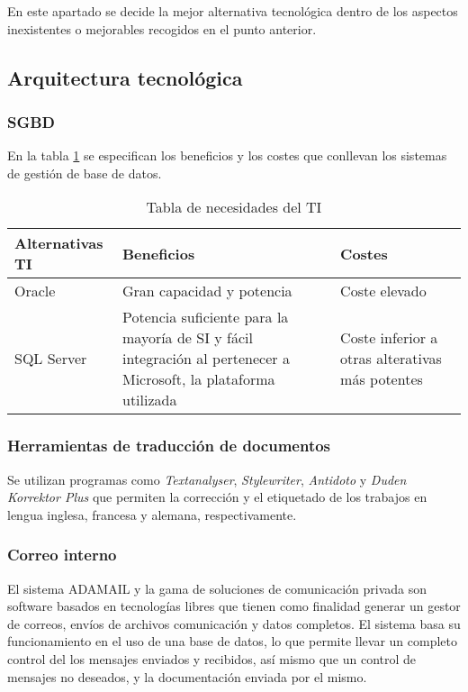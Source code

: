 \documentclass[11pt,a4paper,spanish,twoside]{book}
\begin{document}
En este apartado se decide la mejor alternativa tecnológica
dentro de los aspectos inexistentes o mejorables recogidos en el punto
anterior.

\subsection{Arquitectura tecnológica} \label{ss:7.2.1}
\subsubsection{SGBD}
En la tabla \ref{Tab:TabNecTI} se especifican los beneficios y los costes que
conllevan los sistemas de gestión de base de datos.
\begin{table}[!h]
\centering
  \begin{tabular}{p{3cm}p{4.7cm}p{2.3cm}}
    \textbf{Alternativas TI} & \textbf{Beneficios} &
    \textbf{Costes} \\
    \hline \hline
    Oracle\cite{ora} & Gran capacidad y potencia & Coste elevado\\ \hline
    SQL Server\cite{sql} & Potencia suficiente para la mayoría de SI y fácil
    integración al pertenecer a Microsoft, la plataforma utilizada & Coste
    inferior a otras alterativas más potentes\\ \hline
  \end{tabular}
\caption{Tabla de necesidades del TI} \label{Tab:TabNecTI}
\end{table}

\subsubsection{Herramientas de traducción de documentos}
Se utilizan programas como \emph{Textanalyser}, \emph{Stylewriter},
\emph{Antidoto} y \emph{Duden Korrektor Plus} que permiten la corrección y el
etiquetado de los trabajos en lengua inglesa, francesa y alemana,
respectivamente\cite{tra}. 

\subsubsection{Correo interno}
El sistema ADAMAIL\cite{ada} y la gama de soluciones de comunicación privada
son software basados en tecnologías libres que tienen como finalidad generar un
gestor de correos, envíos de archivos comunicación y datos completos. El
sistema basa su funcionamiento en el uso de una base de datos, lo que permite
llevar un completo control del los mensajes enviados y recibidos, así mismo
que un control de mensajes no deseados, y la documentación enviada por el
mismo. 
\end{document}
